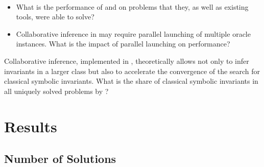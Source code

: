 \begin{resquest}[Performance]\label{rq:perf}
$ $

\begin{itemize}
    \item What is the performance of \theringen{} and \ringenSync{} on problems that they, as well as existing tools, were able to solve?
    \item Collaborative inference in \theringenCICI{} may require parallel launching of multiple oracle instances. What is the impact of parallel launching on performance?

\end{itemize}
\end{resquest}

\begin{resquest}\label{rq:char}
Collaborative inference, implemented in \theringenCICI{}, theoretically allows not only to infer invariants in a larger class but also to accelerate the convergence of the search for classical symbolic invariants. What is the share of classical symbolic invariants in all uniquely solved problems by \theringenCICI{}?
\end{resquest}

\section{Results}



\subsection{Number of Solutions}

